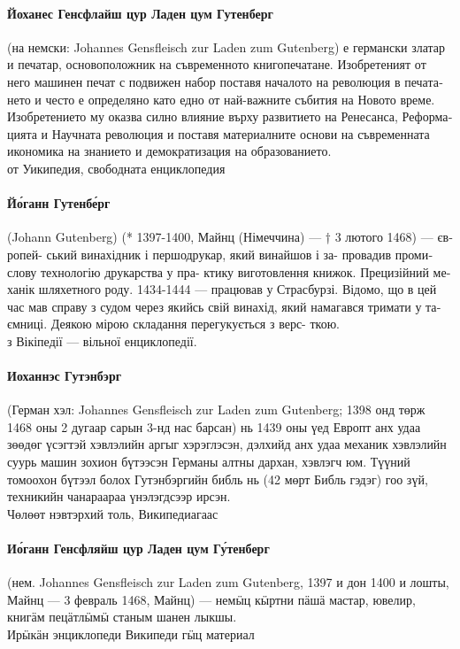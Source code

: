 \documentclass[pagesize,DIV14]{scrartcl}
\begin{document}
\begin{multicols}{2}
\begin{bulgarian}
\paragraph*{Йоханес Генсфлайш цур Ладен цум Гутенберг} (на немски: Johannes Gensfleisch zur Laden zum Gutenberg) е германски златар и печатар, основоположник на съвременното книгопечатане. Изобретеният от него машинен печат с подвижен набор поставя началото на революция в печатането и често е определяно като едно от най-важните събития на Новото време. Изобретението му оказва силно влияние върху развитието на Ренесанса, Реформацията и Научната революция и поставя материалните основи на съвременната икономика на знанието и демократизация на образованието.\\
{\scriptsize от Уикипедия, свободната енциклопедия}
\end{bulgarian}

\begin{ukrainian}
\paragraph*{Йо́ганн Гутенбе́рг} (Johann Gutenberg) (* 1397-1400,
Майнц (Німеччина) — † 3 лютого 1468) — європей-
ський винахідник і першодрукар, який винайшов і за-
провадив промислову технологію друкарства у пра-
ктику виготовлення книжок.
Прецизійний механік шляхетного роду.
1434-1444 — працював у Страсбурзі. Відомо, що в
цей час мав справу з судом через якийсь свій винахід,
який намагався тримати у таємниці.
Деякою мірою складання перегукується з верс-
ткою.\\
{\scriptsize з Вікіпедії — вільної енциклопедії.}
\end{ukrainian}

\paragraph*{Иоханнэс Гутэнбэрг} (Герман хэл: Johannes Gensfleisch
zur Laden zum Gutenberg; 1398 онд төрж 1468
оны 2 дугаар сарын 3-нд нас барсан) нь 1439 оны
үед Европт анх удаа зөөдөг үсэгтэй хэвлэлийн аргыг
хэрэглэсэн, дэлхийд анх удаа механик хэвлэлийн
суурь машин зохион бүтээсэн Германы алтны
дархан, хэвлэгч юм. Түүний томоохон бүтээл болох
Гутэнбэргийн библь нь (42 мөрт Библь гэдэг) гоо зүй,
техникийн чанараараа үнэлэгдсээр ирсэн.\\
{\scriptsize Чөлөөт нэвтэрхий толь, Википедиагаас}

\paragraph*{Ио́ганн Генсфляйш цур Ладен цум Гу́тенберг} (нем.
Johannes Gensfleisch zur Laden zum Gutenberg, 1397
и дон 1400 и лошты, Майнц — 3 февраль 1468,
Майнц) — немӹц кӹртни пӓшӓ мастар, ювелир,
книгӓм пецӓтлӹмӹ станым шанен лыкшы.\\
{\scriptsize Ирӹкӓн энциклопеди Википеди гӹц материал}



\end{multicols}
\end{document}
